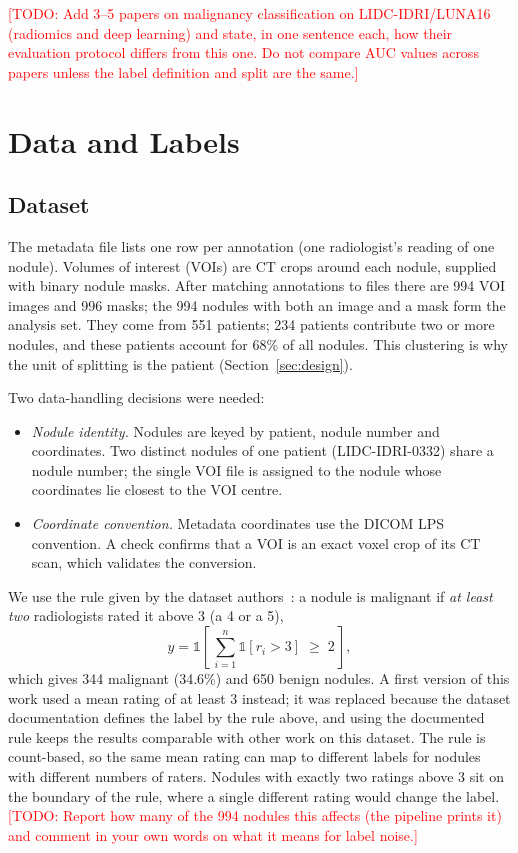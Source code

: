 \documentclass[journal]{IEEEtran}
\newcommand{\TODO}[1]{\textcolor{red}{[TODO: #1]}}
\begin{document}
\TODO{Add 3--5 papers on malignancy classification on LIDC-IDRI/LUNA16 (radiomics and deep learning) and
state, in one sentence each, how their evaluation protocol differs from this one. Do not compare
AUC values across papers unless the label definition and split are the same.}

\section{Data and Labels}
\label{sec:data}

\subsection{Dataset}
The metadata file lists one row per annotation (one radiologist's reading of one nodule). Volumes of
interest (VOIs) are CT crops around each nodule, supplied with binary nodule masks. After matching
annotations to files there are 994 VOI images and 996 masks; the 994 nodules with both an image and
a mask form the analysis set. They come from 551 patients; 234 patients contribute two or more
nodules, and these patients account for 68\% of all nodules. This clustering is why the unit of
splitting is the patient (Section~\ref{sec:design}).

Two data-handling decisions were needed:
\begin{itemize}
  \item \emph{Nodule identity.} Nodules are keyed by patient, nodule number and coordinates. Two distinct
        nodules of one patient (LIDC-IDRI-0332) share a nodule number; the single VOI file is assigned
        to the nodule whose coordinates lie closest to the VOI centre.
  \item \emph{Coordinate convention.} Metadata coordinates use the DICOM LPS convention. A check confirms
        that a VOI is an exact voxel crop of its CT scan, which validates the conversion.
\end{itemize}

We use the rule given by the dataset authors~\cite{setio2017luna16}: a nodule is malignant if \emph{at least two}
radiologists rated it above 3 (a 4 or a 5),
\begin{equation}
  y = \mathbb{1}\!\left[\, \sum_{i=1}^{n} \mathbb{1}[r_i > 3] \;\geq\; 2 \,\right],
  \label{eq:label}
\end{equation}
which gives 344 malignant (34.6\%) and 650 benign nodules. A first version of this work used a mean rating of at
least 3 instead; it was replaced because the dataset documentation defines the label by the rule above, and
using the documented rule keeps the results comparable with other work on this dataset. The rule is
count-based, so the same mean rating can map to different labels for nodules with different numbers of raters.
Nodules with exactly two ratings above 3 sit on the boundary of the rule, where a single different rating
would change the label. \TODO{Report how many of the 994 nodules this affects (the pipeline prints it) and
comment in your own words on what it means for label noise.}
\end{document}
